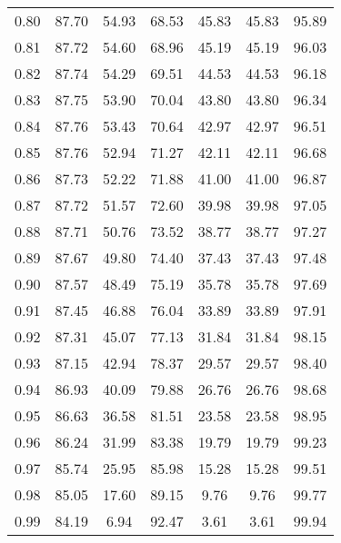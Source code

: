 \begin{tabular}{|c|c|c|c|c|c|c|}
      0.80 &     87.70 &     54.93 &      68.53 &   45.83 &      45.83 &         95.89 \\
      0.81 &     87.72 &     54.60 &      68.96 &   45.19 &      45.19 &         96.03 \\
      0.82 &     87.74 &     54.29 &      69.51 &   44.53 &      44.53 &         96.18 \\
      0.83 &     87.75 &     53.90 &      70.04 &   43.80 &      43.80 &         96.34 \\
      0.84 &     87.76 &     53.43 &      70.64 &   42.97 &      42.97 &         96.51 \\
      0.85 &     87.76 &     52.94 &      71.27 &   42.11 &      42.11 &         96.68 \\
      0.86 &     87.73 &     52.22 &      71.88 &   41.00 &      41.00 &         96.87 \\
      0.87 &     87.72 &     51.57 &      72.60 &   39.98 &      39.98 &         97.05 \\
      0.88 &     87.71 &     50.76 &      73.52 &   38.77 &      38.77 &         97.27 \\
      0.89 &     87.67 &     49.80 &      74.40 &   37.43 &      37.43 &         97.48 \\
      0.90 &     87.57 &     48.49 &      75.19 &   35.78 &      35.78 &         97.69 \\
      0.91 &     87.45 &     46.88 &      76.04 &   33.89 &      33.89 &         97.91 \\
      0.92 &     87.31 &     45.07 &      77.13 &   31.84 &      31.84 &         98.15 \\
      0.93 &     87.15 &     42.94 &      78.37 &   29.57 &      29.57 &         98.40 \\
      0.94 &     86.93 &     40.09 &      79.88 &   26.76 &      26.76 &         98.68 \\
      0.95 &     86.63 &     36.58 &      81.51 &   23.58 &      23.58 &         98.95 \\
      0.96 &     86.24 &     31.99 &      83.38 &   19.79 &      19.79 &         99.23 \\
      0.97 &     85.74 &     25.95 &      85.98 &   15.28 &      15.28 &         99.51 \\
      0.98 &     85.05 &     17.60 &      89.15 &    9.76 &       9.76 &         99.77 \\
      0.99 &     84.19 &      6.94 &      92.47 &    3.61 &       3.61 &         99.94 \\
\bottomrule
\end{tabular}
